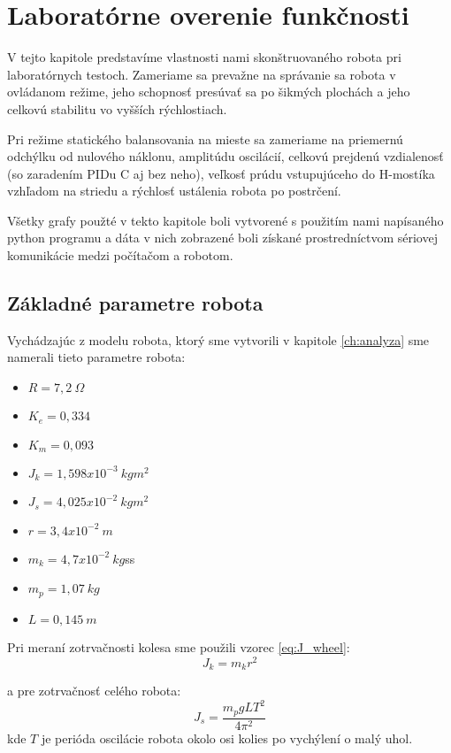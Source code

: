 \chapter{Laboratórne overenie funkčnosti}

V tejto kapitole predstavíme vlastnosti nami skonštruovaného robota pri laboratórnych testoch. Zameriame sa prevažne na správanie sa robota v ovládanom režime, jeho schopnosť presúvať sa po šikmých plochách a jeho celkovú stabilitu vo vyšších rýchlostiach.

Pri režime statického balansovania na mieste sa zameriame na priemernú odchýlku od nulového náklonu, amplitúdu oscilácií, celkovú prejdenú vzdialenosť (so zaradením PIDu C aj bez neho), veľkosť prúdu vstupujúceho do H-mostíka vzhľadom na striedu a rýchlosť ustálenia robota po postrčení.

Všetky grafy použté v tekto kapitole boli vytvorené s použitím nami napísaného python programu a dáta v nich zobrazené boli získané prostredníctvom sériovej komunikácie medzi počítačom a robotom.  

\section{Základné parametre robota}
Vychádzajúc z modelu robota, ktorý sme vytvorili v kapitole \ref{ch:analyza} sme namerali tieto parametre robota:

\begin{multicols}{2}
\begin{itemize}
\item{$R = 7,2 ~\Omega$}
\item{$K_e = 0,334$}
\item{$K_m = 0,093$}
\item{$J_k = 1,598x10^{-3}~ kgm^{2}$}
\item{$J_s = 4,025x10^{-2}~ kgm^{2}$}
\item{$r = 3,4x10^{-2}~ m$}
\item{$m_k = 4,7x10^{-2}~ kg$ss}
\item{$m_p = 1,07 ~kg$}
\item{$L = 0,145 ~m$}
\end{itemize}
\end{multicols}

Pri meraní zotrvačnosti kolesa sme použili vzorec \ref{eq:J_wheel}:
\begin{equation}
J_k = m_kr^2
\label{eq:J_wheel}
\end{equation}

a pre zotrvačnosť celého robota:
\begin{equation}
J_s = \dfrac{m_pgLT^2}{4\pi^2}
\label{eq:J_robot}
\end{equation}
kde $T$ je perióda oscilácie robota okolo osi kolies po vychýlení o malý uhol.

